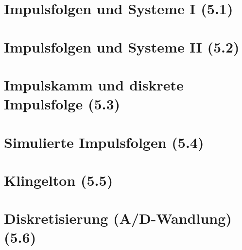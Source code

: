 \documentclass[12pt,paper=A4,ngerman,headings=small,footlines=2.1,footheight=15mm]{scrreprt}
\begin{document}
	


\tableofcontents

\cleardoublepage

\chapter{Impulsfolgen und Systeme I (5.1)}


\chapter{Impulsfolgen und Systeme II (5.2)}


\chapter{Impulskamm und diskrete Impulsfolge (5.3)}


\chapter{Simulierte Impulsfolgen (5.4)}
%

\chapter{Klingelton (5.5)}
%

\chapter{Diskretisierung (A/D-Wandlung) (5.6)}
%
\end{document}
